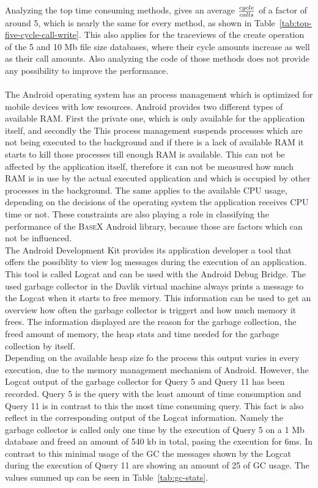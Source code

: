 Analyzing the top time consuming methods, gives an average ${cycle \over calls}$ of a factor of around 5, which is nearly the same for every method, as shown in Table~\ref{tab:top-five-cycle-call-write}.
This also applies for the traceviews of the create operation of the 5 and 10 Mb file size databases, where their cycle amounts increase as well as their call amounts.
Also analyzing the code of those methods does not provide any possibility to improve the performance.\\
\\
The Android operating system has an process management which is optimized for mobile devices with low resources.
Android provides two different types of available RAM. 
First the private one, which is only available for the application itself, and secondly the 
This process management suspends processes which are not being executed to the background and if there is a lack of available RAM it starts to kill those processes till enough RAM is available.
This can not be affected by the application itself, therefore it can not be measured how much RAM is in use by the actual executed application and which is occupied by other processes in the background.
The same applies to the available CPU usage, depending on the decisions of the operating system the application receives CPU time or not.
These constraints are also playing a role in classifying the performance of the \textsc{BaseX} Android library, because those are factors which can not be influenced.\\
The Android Development Kit provides its application developer a tool that offers the possiblity to view log messages during the execution of an application.
This tool is called Logcat and can be used with the Android Debug Bridge.
The used garbage collector in the Davlik virtual machine always prints a message to the Logcat when it starts to free memory.
This information can be used to get an overview how often the garbage collector is triggert and how much memory it frees.
The information displayed are the reason for the garbage collection, the freed amount of memory, the heap stats and time needed for the garbage collection by itself.\\
Depending on the available heap size fo the process this output varies in every execution, due to the memory management mechanism of Android.
However, the Logcat output of the garbage collector for Query 5 and Query 11 has been recorded.
Query 5 is the query with the least amount of time consumption and Query 11 is in contrast to this the most time consuming query.
This fact is also reflect in the corresponding output of the Logcat information.
Namely the garbage collector is called only one time by the execution of Query 5 on a 1 Mb database and freed an amount of 540 kb in total, pasing the execution for 6ms.
In contrast to this minimal usage of the GC the messages shown by the Logcat during the execution of Query 11 are showing an amount of 25 of GC usage.
The values summed up can be seen in Table~\ref{tab:gc-stats}.

